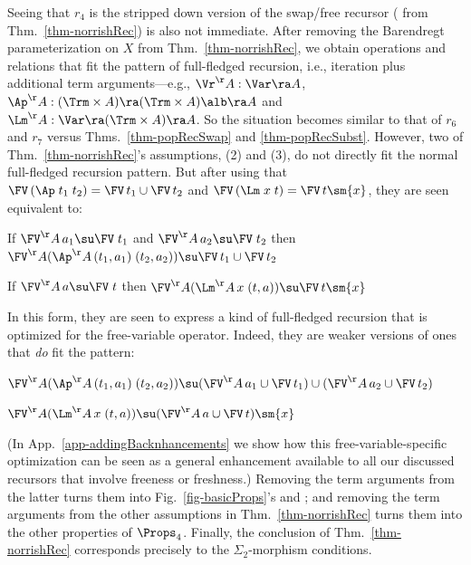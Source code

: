 Seeing that $r_4$ is the stripped down version of the swap/free recursor (%
from Thm.~\ref{thm-norrishRec}) is also not immediate. After removing the Barendregt parameterization on $X$ from Thm.~\ref{thm-norrishRec}, we obtain operations and relations that fit the pattern of full-fledged recursion, i.e., iteration plus additional term arguments---e.g., $\Vr^\AA : \Var \ra A$, 
$\Ap^\AA : (\Trm \times A) \ra (\Trm \times A)\alb \ra A$ and 
$\Lm^\AA : \Var \ra (\Trm \times A) \ra A$. So the situation becomes similar to that 
of $r_6$ and $r_7$ versus Thms.~\ref{thm-popRecSwap} and \ref{thm-popRecSubst}. 
However, two of Thm.~\ref{thm-norrishRec}'s assumptions, 
(2) and (3), do not 
directly fit the normal full-fledged recursion pattern. %
But after using %
that $	\FV\,(\Ap\;t_1\;t_2) = \FV\,t_1 \cup \FV\,t_2$ and $\FV\,(\Lm\;x\;t) = \FV\,t \sm \{x\}$, they are seen equivalent to: 
	\begin{myitem}
	\item[(2)] 
	If $\FV^\AA\,a_1 \su \FV\;t_1$ and $\FV^\AA\,a_2 \su \FV\;t_2$ 
	then  
	$\FV^\AA(\Ap^\AA\,(t_1,a_1)\;(t_2,a_2)) \su \FV\,t_1 \cup \FV\,t_2$
	\item[(3)]  
	If $\FV^\AA\,a \su \FV\;t$  
	then  
	$\FV^\AA(\Lm^\AA\,x\;(t,a)) \su  \FV\,t \sm \{x\}$
	\end{myitem} 
In this form, they are seen to express a kind of full-fledged recursion that is optimized for the free-variable operator. %
Indeed, they 
%
are weaker %
versions of ones that \emph{do} fit the pattern:
\begin{myitem}
	\item[(2)] 
	$\FV^\AA(\Ap^\AA\,(t_1,a_1)\;(t_2,a_2)) \su (\FV^\AA\,a_1 \cup \FV\,t_1) \cup (\FV^\AA\,a_2 \cup \FV\,t_2)$
	\item[(3)]  
	$\FV^\AA(\Lm^\AA\,x\;(t,a)) \su  (\FV^\AA\,a  \cup \FV\,t) \sm \{x\}$
\end{myitem} 
(In App.~\ref{app-addingBacknhancements} 
we show how this free-variable-specific optimization can be seen as a general enhancement available to all our discussed recursors that involve freeness or freshness.)  
Removing the term arguments from the latter turns them into Fig.~\ref{fig-basicProps}'s  %
\FvAp{} and \FvLm{}; and removing the term arguments from the other assumptions in Thm.~\ref{thm-norrishRec} turns them into the other properties of $\Props_4$.  Finally, the conclusion of Thm.~\ref{thm-norrishRec} corresponds precisely to the $\Sigma_2$-morphism conditions. 

